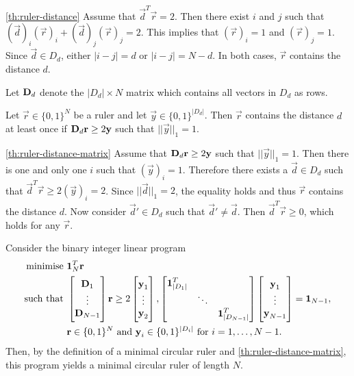 \documentclass[a4paper, openany, oneside]{memoir}
\begin{document}
\begin{blockProofTheorem}{\ref{th:ruler-distance}}
    Assume that $\vec{d}^T\vec{r} = 2$. Then there exist $i$ and $j$ such that $(\vec{d})_i (\vec{r})_i + (\vec{d})_j (\vec{r})_j = 2$. This implies that $(\vec{r})_i = 1$ and $(\vec{r})_j = 1$. Since $\vec{d} \in D_d$, either $|i-j|=d$ or $|i-j| = N-d$. In both cases, $\vec{r}$ contains the distance $d$. 
\end{blockProofTheorem}

Let $\boldsymbol{\mathbf{D}}_d$ denote the $|D_d| \times N$ matrix which contains all vectors in $D_d$ as rows.

\begin{blockTheorem} \label{th:ruler-distance-matrix}\nolinebreak
    Let $\vec{r} \in \{0,1\}^N$ be a ruler and let $\vec{y} \in \{0,1\}^{|D_d|}$. Then $\vec{r}$ contains the distance $d$ at least once if $\boldsymbol{\mathbf{D}}_d \boldsymbol{\mathbf{r}} \ge 2\boldsymbol{\mathbf{y}}$ such that $||\vec{y}||_1 = 1$.
\end{blockTheorem}

\begin{blockProofTheorem}{\ref{th:ruler-distance-matrix}}
    Assume that $\boldsymbol{\mathbf{D}}_d \boldsymbol{\mathbf{r}} \ge 2 \boldsymbol{\mathbf{y}}$ such that $||\vec{y}||_1 = 1$. Then there is one and only one $i$ such that $(\vec{y})_i=1$. Therefore there exists a $\vec{d} \in D_d$ such that $\vec{d}^T \vec{r} \ge 2 (\vec{y})_i = 2$. Since $||\vec{d}||_1=2$, the equality holds and thus $\vec{r}$ contains the distance $d$. Now consider $\vec{d}' \in D_d$ such that $\vec{d}' \neq \vec{d}$. Then $\vec{d}^T \vec{r} \ge 0$, which holds for any $\vec{r}$.  
\end{blockProofTheorem}

Consider the binary integer linear program
\begin{align*}
    \text{minimise } &\boldsymbol{\mathbf{1}}_N^T \boldsymbol{\mathbf{r}} \\
    \text{such that } &
    \begin{bmatrix}
        \boldsymbol{\mathbf{D}}_1 \\
        \vdots \\
        \boldsymbol{\mathbf{D}}_{N-1}
    \end{bmatrix} \boldsymbol{\mathbf{r}} \ge 2 \begin{bmatrix}
        \boldsymbol{\mathbf{y}}_1 \\
        \vdots \\
        \boldsymbol{\mathbf{y}}_2
    \end{bmatrix}, \begin{bmatrix}
        \boldsymbol{\mathbf{1}}_{|D_1|}^T & & \\
        & \ddots & \\
        & & \boldsymbol{\mathbf{1}}_{|D_{N-1}|}^T
    \end{bmatrix}  \begin{bmatrix}
        \boldsymbol{\mathbf{y}}_1 \\
        \vdots \\
        \boldsymbol{\mathbf{y}}_{N-1}
    \end{bmatrix} = \boldsymbol{\mathbf{1}}_{N-1}, \\
    & \boldsymbol{\mathbf{r}} \in \{0,1\}^N \text{ and } \boldsymbol{\mathbf{y}}_i \in \{0,1\}^{|D_i|} \text{ for } i = 1,\ldots,N-1.
\end{align*}
Then, by the definition of a minimal circular ruler and \cref{th:ruler-distance-matrix}, this program yields a minimal circular ruler of length $N$.
\end{document}
